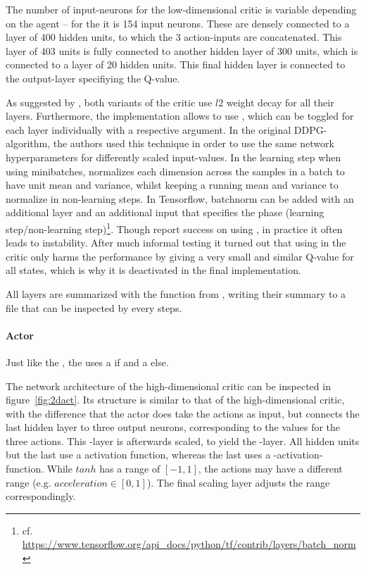 The number of input-neurons for the low-dimensional critic is variable depending on the agent -- for the  it is 154 input neurons. These are densely connected to a layer of 400 hidden units, to which the 3 action-inputs are concatenated. This layer of 403 units is fully connected to another hidden layer of 300 units, which is connected to a layer of 20 hidden units. This final hidden layer is connected to the output-layer specifiying the Q-value.

As suggested by \cite{lillicrap_continuous_2015}, both variants of the critic use $l2$ weight decay for all their layers. Furthermore, the implementation allows to use \cite{ioffe_batch_2015}, which can be toggled for each layer individually with a respective argument. In the original DDPG-algorithm, the authors used this technique in order to use the same network hyperparameters for differently scaled input-values. In the learning step when using minibatches, \batchnorm normalizes each dimension across the samples in a batch to have unit mean and variance, whilst keeping a running mean and variance to normalize in non-learning steps. In Tensorflow, batchnorm can be added with an additional layer and an additional input that specifies the phase (learning step/non-learning step)\footnote{cf. \url{https://www.tensorflow.org/api\_docs/python/tf/contrib/layers/batch_norm}}. Though \cite{lillicrap_continuous_2015} report success on using \batchnorm, in practice it often leads to instability. After much informal testing it turned out that using \batchnorm in the critic only harms the performance by giving a very small and similar Q-value for all states, which is why it is deactivated in the final implementation.

All layers are summarized with the function  from , writing their summary to a file that can be inspected by  every  steps. 


\paragraph{Actor}

Just like the , the  uses a  if  and a  else.

The network architecture of the high-dimensional critic can be inspected in figure~\ref{fig:2dact}. Its structure is similar to that of the high-dimensional critic, with the difference that the actor does take the actions as input, but connects the last hidden layer to three output neurons, corresponding to the values for the three actions. This -layer is afterwards scaled, to yield the -layer. All hidden units but the last use a  activation function, whereas the last uses a -activation-function. While $tanh$ has a range of $[-1,1]$, the actions may have a different range (e.g. $acceleration \in [0,1]$). The final scaling layer adjusts the range correspondingly.

